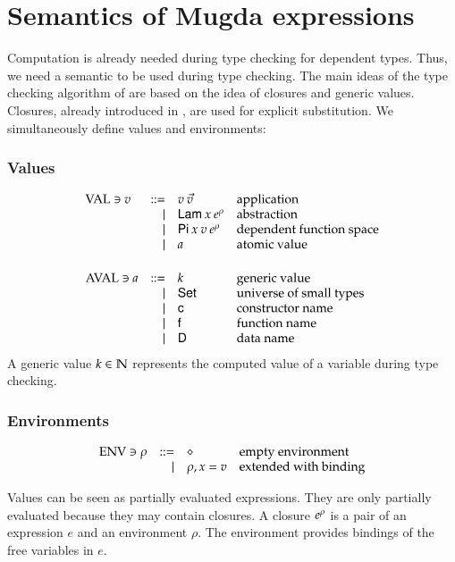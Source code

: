 \section{Semantics of Mugda expressions}
Computation is already needed during type checking for dependent types.
Thus, we need a semantic to be used during type checking.
The main ideas of the type checking algorithm of \cite{coquand96algorithm} are based on the idea of closures and generic values.
Closures, already introduced in \cite{Landin63}, are used for explicit substitution.
We simultaneously define values and environments:

\subsubsection{Values}
\[
\begin{array}{lrll}
\Val \ni v & ::= & v \: \vec{v} & \mbox{application}\\
& \mid & \vlam \: x \: \cl{e}{\rho} & \mbox{abstraction}\\
& \mid & \vpi \: x \: v \: \cl{e}{\rho} & \mbox{dependent function space}\\
& \mid & a & \mbox{atomic value}\\
\vs\\
\AVal \ni a & ::= & k & \mbox{generic value}\\
& \mid & \Set & \mbox{universe of small types} \\
& \mid & \cc & \mbox{constructor name}\\
& \mid & \ff & \mbox{function name}\\
& \mid & \DD & \mbox{data name}\\
\end{array}
\]
A generic value $k \in \mathbb{N}$ represents the computed value of a variable during type checking.

\subsubsection{Environments}
\[
\begin{array}{lrll}
\operatorname{ENV} \ni \rho & ::= & \diamond & \mbox{empty environment}\\
& \mid & \rho,x = v & \mbox{extended with binding}\\
\end{array}
\]

Values can be seen as partially evaluated expressions.
They are only partially evaluated because they may contain closures.
A closure $e^{\rho}$ is a pair of an expression $e$ and an environment $\rho$.
The environment provides bindings of the free variables in $e$.
